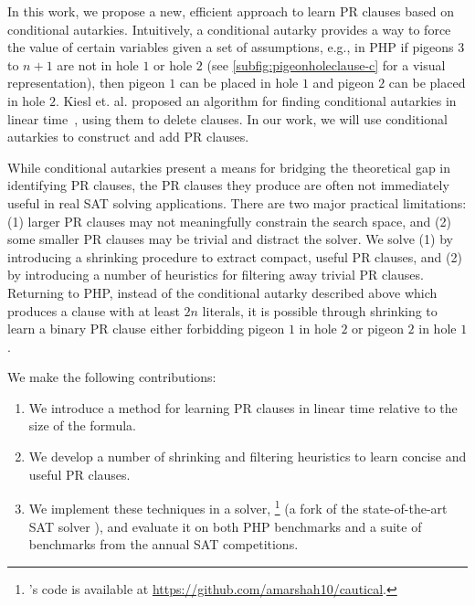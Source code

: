 In this work, we propose a new, efficient approach to learn PR clauses
based on conditional autarkies. Intuitively, a conditional autarky provides a
way to force the value of certain variables given a set of assumptions, e.g., in
PHP if pigeons $3 $ to $ n+1$ are not in hole $1$ or hole $2$ (see \autoref{subfig:pigeonholeclause-c}
for a visual representation), then pigeon $1$
can be placed in hole $1$ and pigeon $2$ can be placed in hole $2$. Kiesl et.
al. proposed an algorithm for finding conditional autarkies in linear
time~\cite{conditionalautarkies}, using them to delete clauses. In our work, we
will use conditional autarkies to construct and add PR clauses. 


While conditional autarkies present a means for bridging the theoretical gap in
identifying PR clauses, the PR clauses they produce are often not immediately useful
in real SAT solving applications. There are two major practical limitations: (1)
larger PR clauses may not meaningfully constrain the search space, and (2) some
smaller PR clauses may be trivial and distract the solver. We solve (1) by
introducing a shrinking procedure to extract compact, useful PR clauses, and
(2) by introducing a number of heuristics for filtering away trivial PR
clauses. Returning to PHP, instead of the conditional autarky described above
which produces a clause with at least $2n$ literals, it is possible through
shrinking to learn a binary PR clause either forbidding pigeon $1$ in hole $2$ or
pigeon $2$ in hole $1$.


We make the following contributions: 

\begin{enumerate} 
    \item We introduce a method for learning PR clauses in linear time relative to the
    size of the formula. 
    \item We develop a number of shrinking and filtering heuristics to learn
    concise and useful PR clauses. 
    \item We implement these techniques in a solver, \tool\footnote{\tool's code
    is available at \url{https://github.com/amarshah10/cautical}.} (a fork of
    the state-of-the-art SAT solver \cadical), and evaluate it on both PHP benchmarks 
    and a suite of benchmarks from the annual SAT competitions.
\end{enumerate}